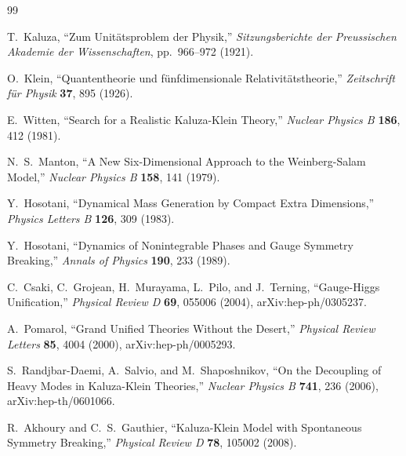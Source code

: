 \begin{thebibliography}{99}

T.~Kaluza,
``Zum Unitätsproblem der Physik,''
\emph{Sitzungsberichte der Preussischen Akademie der Wissenschaften}, pp.~966--972 (1921).

O.~Klein,
``Quantentheorie und fünfdimensionale Relativitätstheorie,''
\emph{Zeitschrift für Physik} \textbf{37}, 895 (1926).

E.~Witten,
``Search for a Realistic Kaluza-Klein Theory,''
\emph{Nuclear Physics B} \textbf{186}, 412 (1981).

N.~S.~Manton,
``A New Six-Dimensional Approach to the Weinberg-Salam Model,''
\emph{Nuclear Physics B} \textbf{158}, 141 (1979).

Y.~Hosotani,
``Dynamical Mass Generation by Compact Extra Dimensions,''
\emph{Physics Letters B} \textbf{126}, 309 (1983).

Y.~Hosotani,
``Dynamics of Nonintegrable Phases and Gauge Symmetry Breaking,''
\emph{Annals of Physics} \textbf{190}, 233 (1989).

C.~Csaki, C.~Grojean, H.~Murayama, L.~Pilo, and J.~Terning,
``Gauge-Higgs Unification,''
\emph{Physical Review D} \textbf{69}, 055006 (2004),
arXiv:hep-ph/0305237.

A.~Pomarol,
``Grand Unified Theories Without the Desert,''
\emph{Physical Review Letters} \textbf{85}, 4004 (2000),
arXiv:hep-ph/0005293.

S.~Randjbar-Daemi, A.~Salvio, and M.~Shaposhnikov,
``On the Decoupling of Heavy Modes in Kaluza-Klein Theories,''
\emph{Nuclear Physics B} \textbf{741}, 236 (2006),
arXiv:hep-th/0601066.

R.~Akhoury and C.~S.~Gauthier,
``Kaluza-Klein Model with Spontaneous Symmetry Breaking,''
\emph{Physical Review D} \textbf{78}, 105002 (2008).

\end{thebibliography}
